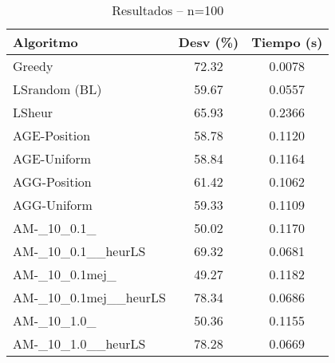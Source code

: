 \begin{table}[ht]
  \centering
  \caption{Resultados – n=100}
  \begin{tabular}{lcc}
  \hline
  Algoritmo & Desv (\%) & Tiempo (s) \\
  \hline
  Greedy & 72.32 & 0.0078 \\
  LSrandom (BL) & 59.67 & 0.0557 \\
  LSheur & 65.93 & 0.2366 \\
  AGE-Position & 58.78 & 0.1120 \\
  AGE-Uniform & 58.84 & 0.1164 \\
  AGG-Position & 61.42 & 0.1062 \\
  AGG-Uniform & 59.33 & 0.1109 \\
  AM-\_10\_0.1\_ & 50.02 & 0.1170 \\
  AM-\_10\_0.1\_\_heurLS & 69.32 & 0.0681 \\
  AM-\_10\_0.1mej\_ & 49.27 & 0.1182 \\
  AM-\_10\_0.1mej\_\_heurLS & 78.34 & 0.0686 \\
  AM-\_10\_1.0\_ & 50.36 & 0.1155 \\
  AM-\_10\_1.0\_\_heurLS & 78.28 & 0.0669 \\
  \hline
  \end{tabular}
\end{table}
